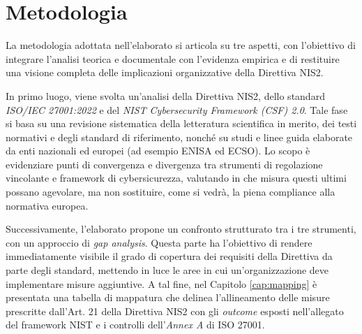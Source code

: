 \section{Metodologia}
La metodologia adottata nell’elaborato si articola su tre aspetti, con l’obiettivo di integrare l’analisi 
teorica e documentale con l’evidenza empirica e di restituire una visione completa delle implicazioni organizzative della Direttiva NIS2.

In primo luogo, viene svolta un’analisi della Direttiva NIS2, dello standard \textit{ISO/IEC 27001:2022} e del \textit{NIST Cybersecurity Framework (CSF) 2.0}. 
Tale fase si basa su una revisione sistematica della letteratura scientifica in merito, dei testi normativi e degli standard di riferimento, nonché su 
studi e linee guida elaborate da enti nazionali ed europei (ad esempio ENISA ed ECSO). Lo scopo è evidenziare punti di convergenza e divergenza tra strumenti 
di regolazione vincolante e framework di cybersicurezza, valutando in che misura questi ultimi possano agevolare, ma non sostituire, come si vedrà,
la piena compliance alla normativa europea.

Successivamente, l’elaborato propone un confronto strutturato tra i tre strumenti, con un approccio di \textit{gap analysis}.
Questa parte ha l’obiettivo di rendere immediatamente visibile il grado di copertura dei requisiti della Direttiva da parte degli standard, 
mettendo in luce le aree in cui un’organizzazione deve implementare misure aggiuntive. A tal fine, nel Capitolo \ref{cap:mapping} è presentata una tabella di mappatura che 
delinea l'allineamento delle misure prescritte dall'Art. 21 della Direttiva NIS2 con gli \textit{outcome} esposti nell'allegato del framework NIST
e i controlli dell'\textit{Annex A} di ISO 27001.

